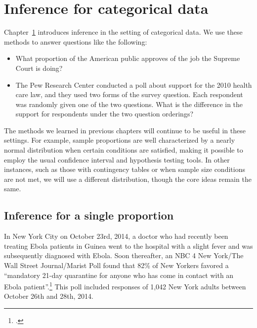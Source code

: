
\chapter{Inference for categorical data}
\label{inferenceForCategoricalData}

Chapter~\ref{inferenceForCategoricalData} introduces inference in the setting of categorical data. We use these methods to answer questions like the following:
\begin{itemize}
\setlength{\itemsep}{0mm}
\item What proportion of the American public approves of the job the Supreme Court is doing?
\item The Pew Research Center conducted a poll about support for the 2010 health care law, and they used two forms of the survey question. Each respondent was randomly given one of the two questions. What is the difference in the support for respondents under the two question orderings?
\end{itemize}
The methods we learned in previous chapters will continue to be useful in these settings. For example, sample proportions are well characterized by a nearly normal distribution when certain conditions are satisfied, making it possible to employ the usual confidence interval and hypothesis testing tools. In other instances, such as those with contingency tables or when sample size conditions are not met, we will use a different distribution, though the core ideas remain the same.


\section{Inference for a single proportion}
\label{singleProportion}


In New York City on October 23rd, 2014, a doctor who had recently been treating Ebola patients in Guinea went to the hospital with a slight fever and was subsequently diagnosed with Ebola. Soon thereafter, an NBC 4 New York/The Wall Street Journal/Marist Poll found that 82\% of New Yorkers favored a ``mandatory 21-day quarantine for anyone who has come in contact with an Ebola patient''.\footnote{.} This poll included responses of 1,042 New York adults between October 26th and 28th, 2014.


\textC{\newpage}


